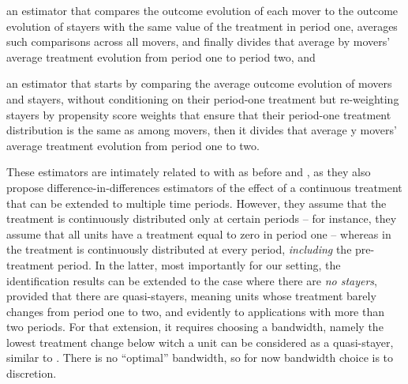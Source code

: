 \documentclass[11pt]{article}
\begin{document}
\begin{inlinelist}
    \item an estimator that compares the outcome evolution of each mover to the outcome evolution of stayers with the same value of the treatment in period one, averages such comparisons across all movers, and finally divides that average by movers' average treatment evolution from period one to period two, and 
    \item an estimator that starts by comparing the average outcome evolution of movers and stayers, without conditioning on their period-one treatment but re-weighting stayers by propensity score weights that ensure that their period-one treatment distribution is the same as among movers, then it divides that average y movers' average treatment evolution from period one to two.
\end{inlinelist}
These estimators are intimately related to with \citet{bib:dechaisemartin2021} as before and \citet{bib:callaway2021}, as they also propose difference-in-differences estimators of the effect of a continuous treatment that can be extended to multiple time periods. However, they assume that the treatment is continuously distributed only at certain periods -- for instance, they assume that all units have a treatment equal to zero in period one -- whereas in \citet{bib:dechaisemartin2022b} the treatment is continuously distributed at every period, \textit{including} the pre-treatment period.
In the latter, most importantly for our setting, the identification results can be extended to the case where there are \textit{no stayers}, provided that there are quasi-stayers, meaning units whose treatment barely changes from period one to two, and evidently to applications with more than two periods. For that extension, it requires choosing a bandwidth, namely the lowest treatment change below witch a unit can be considered as a quasi-stayer, similar to \citet{bib:graham2012}. There is no ``optimal'' bandwidth, so for now bandwidth choice is to discretion.
\end{document}
